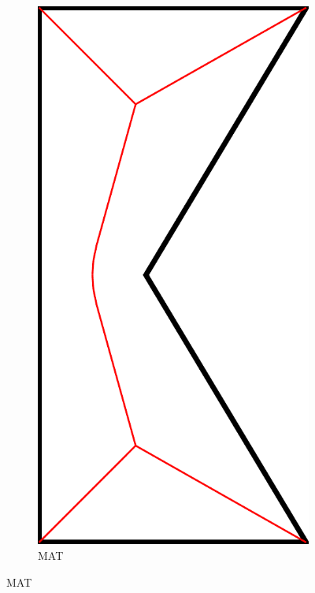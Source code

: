 \begin{figure}\centering
\setlength{\figwidth}{0.24\columnwidth}
\setlength{\figwidthTwo}{0.15\columnwidth}
\begin{subfigure}{\figwidth}\centering
\includegraphics[width=\figwidthTwo]{sources/method/simple_skeleton_mat}
\caption{MAT}\label{shape_decomposition_mat}

\end{subfigure}
\end{figure}
